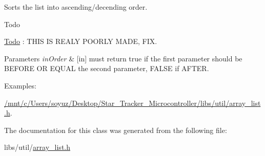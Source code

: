 Sorts the list into ascending/decending order. 

\begin{DoxyRefDesc}{Todo}
\item[\hyperlink{todo__todo000002}{Todo}]\+: T\+H\+IS IS R\+E\+A\+LY P\+O\+O\+R\+LY M\+A\+DE, F\+IX.\end{DoxyRefDesc}



\begin{DoxyParams}{Parameters}
{\em in\+Order} & \mbox{[}in\mbox{]} must return true if the first parameter should be B\+E\+F\+O\+RE OR E\+Q\+U\+AL the second parameter, F\+A\+L\+SE if A\+F\+T\+ER. \\
\hline
\end{DoxyParams}
\begin{Desc}
\item[Examples\+: ]\par
\hyperlink{_2mnt_2c_2Users_2soyuz_2Desktop_2Star_Tracker_Microcontroller_2libs_2util_2array_list_8h-example}{/mnt/c/\+Users/soyuz/\+Desktop/\+Star\+\_\+\+Tracker\+\_\+\+Microcontroller/libs/util/array\+\_\+list.\+h}.\end{Desc}


The documentation for this class was generated from the following file\+:\begin{DoxyCompactItemize}
\item 
libs/util/\hyperlink{array__list_8h}{array\+\_\+list.\+h}\end{DoxyCompactItemize}
